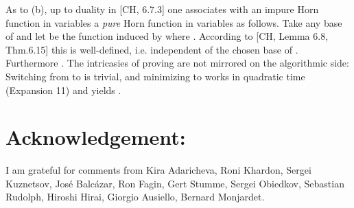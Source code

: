 \documentclass[11pt]{article}
\begin{document}
As to (b), up to duality in [CH, 6.7.3] one associates with an impure Horn function  in  variables a {\it pure} Horn function  in  variables as follows. Take any base  of  and let  be the function induced by  where . According to [CH, Lemma 6.8, Thm.6.15] this is well-defined, i.e. independent of the chosen base  of . Furthermore . The intricasies of proving  are not mirrored on the algorithmic side: Switching from  to  is trivial, and minimizing  to  works in quadratic time (Expansion 11) and yields .



 
 
 
 
\section*{Acknowledgement:} I am grateful for comments from  Kira Adaricheva, Roni Khardon, Sergei Kuznetsov, Jos\'{e} Balc\'{a}zar, Ron Fagin,  Gert Stumme,  Sergei Obiedkov, Sebastian Rudolph, Hiroshi Hirai, Giorgio Ausiello, Bernard Monjardet.
\end{document}
